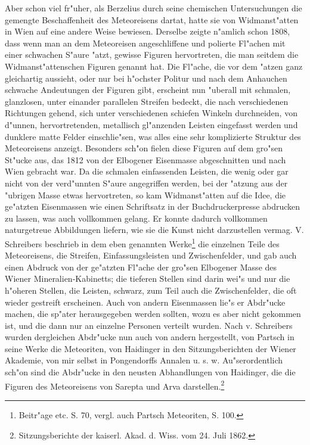 \documentclass[a4paper, 11pt, oneside]{article}
\begin{document}
Aber schon viel fr"uher, als Berzelius durch seine chemischen Untersuchungen die gemengte Beschaffenheit des Meteoreisens dartat, hatte sie von Widmanst"atten in Wien auf eine andere Weise bewiesen. Derselbe zeigte n"amlich schon 1808, dass wenn man an dem Meteoreisen angeschliffene und polierte Fl"achen mit einer schwachen S"aure "atzt, gewisse Figuren hervortreten, die man seitdem die Widmanst"attenschen Figuren genannt hat. Die Fl"ache, die vor dem "atzen ganz gleichartig aussieht, oder nur bei h"ochster Politur und nach dem Anhauchen schwache Andeutungen der Figuren gibt, erscheint nun "uberall mit schmalen, glanzlosen, unter einander parallelen Streifen bedeckt, die nach verschiedenen Richtungen gehend, sich unter verschiedenen schiefen Winkeln durchneiden, von d"unnen, hervortretenden, metallisch gl"anzenden Leisten eingefasst werden und dunklere matte Felder einschlie"sen, was alles eine sehr komplizierte Struktur des Meteoreisens anzeigt. Besonders sch"on fielen diese Figuren auf dem gro"sen St"ucke aus, das 1812 von der Elbogener Eisenmasse abgeschnitten und nach Wien gebracht war. Da die schmalen einfassenden Leisten, die wenig oder gar nicht von der verd"unnten S"aure angegriffen werden, bei der "atzung aus der "ubrigen Masse etwas hervortreten, so kam Widmanst"atten auf die Idee, die ge"atzten Eisenmassen wie einen Schriftsatz in der Buchdruckerpresse abdrucken zu lassen, was auch vollkommen gelang. Er konnte dadurch vollkommen naturgetreue Abbildungen liefern, wie sie die Kunst nicht darzustellen vermag. V. Schreibers beschrieb in dem eben genannten Werke\footnote{Beitr"age etc. S. 70, vergl. auch Partsch Meteoriten, S. 100.} die einzelnen Teile des Meteoreisens, die Streifen, Einfassungsleisten und Zwischenfelder, und gab auch einen Abdruck von der ge"atzten Fl"ache der gro"sen Elbogener Masse des Wiener Mineralien-Kabinetts; die tieferen Stellen sind darin wei"s und nur die h"oheren Stellen, die Leisten, schwarz, zum Teil auch die Zwischenfelder, die oft wieder gestreift erscheinen. Auch von andern Eisenmassen lie"s er Abdr"ucke machen, die sp"ater herausgegeben werden sollten, wozu es aber nicht gekommen ist, und die dann nur an einzelne Personen verteilt wurden. Nach v. Schreibers wurden dergleichen Abdr"ucke nun auch von andern hergestellt, von Partsch in seine Werke die Meteoriten, von Haidinger in den Sitzungsberichten der Wiener Akademie, von mir selbst in Pongendorffs Annalen u. s. w. Au"serordentlich sch"on sind die Abdr"ucke in den neusten Abhandlungen von Haidinger, die die Figuren des Meteoreisens von Sarepta und Arva darstellen.\footnote{Sitzungsberichte der kaiserl. Akad. d. Wiss. vom 24. Juli 1862.}
\end{document}
